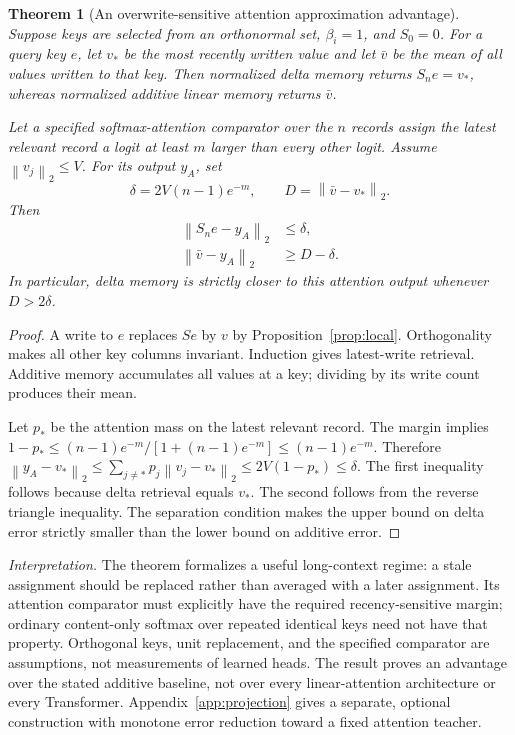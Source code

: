 \documentclass{article}
\newtheorem{theorem}{Theorem}[section]
\theoremstyle{remark}\newtheorem{remark}[theorem]{Remark}
\newcommand{\norm}[1]{\left\lVert #1\right\rVert}
\begin{document}
\begin{theorem}[An overwrite-sensitive attention approximation advantage]
\label{thm:overwrite}
Suppose keys are selected from an orthonormal set, $\beta_i=1$, and $S_0=0$. For a query key $e$, let $v_*$ be the most recently written value and let $\bar v$ be the mean of all values written to that key. Then normalized delta memory returns $S_ne=v_*$, whereas normalized additive linear memory returns $\bar v$.

Let a specified softmax-attention comparator over the $n$ records assign the latest relevant record a logit at least $m$ larger than every other logit. Assume $\norm{v_j}_2\le V$. For its output $y_A$, set
\begin{equation}
 \delta=2V(n-1)e^{-m},\qquad D=\norm{\bar v-v_*}_2.
\end{equation}
Then
\begin{equation}
\begin{split}
 \norm{S_ne-y_A}_2&\le\delta,\\
 \norm{\bar v-y_A}_2&\ge D-\delta.
\end{split}
\label{eq:attentionbound}
\end{equation}
In particular, delta memory is strictly closer to this attention output whenever $D>2\delta$.
\end{theorem}
\begin{proof}
A write to $e$ replaces $Se$ by $v$ by Proposition~\ref{prop:local}. Orthogonality makes all other key columns invariant. Induction gives latest-write retrieval. Additive memory accumulates all values at a key; dividing by its write count produces their mean.

Let $p_*$ be the attention mass on the latest relevant record. The margin implies
$1-p_*\le (n-1)e^{-m}/[1+(n-1)e^{-m}]\le(n-1)e^{-m}$.
Therefore
$\norm{y_A-v_*}_2\le\sum_{j\ne *}p_j\norm{v_j-v_*}_2\le2V(1-p_*)\le\delta$.
The first inequality follows because delta retrieval equals $v_*$. The second follows from the reverse triangle inequality. The separation condition makes the upper bound on delta error strictly smaller than the lower bound on additive error.
\end{proof}

\noindent\textit{Interpretation.} The theorem formalizes a useful long-context regime: a stale assignment should be replaced rather than averaged with a later assignment. Its attention comparator must explicitly have the required recency-sensitive margin; ordinary content-only softmax over repeated identical keys need not have that property. Orthogonal keys, unit replacement, and the specified comparator are assumptions, not measurements of learned heads. The result proves an advantage over the stated additive baseline, not over every linear-attention architecture or every Transformer. Appendix~\ref{app:projection} gives a separate, optional construction with monotone error reduction toward a fixed attention teacher.
\end{document}
